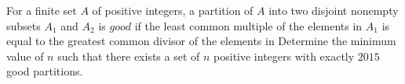 For a finite set $A$ of positive integers, a partition of $A$ into two disjoint nonempty subsets $A_1$ and $A_2$ is $\textit{good}$ if the least common multiple of the elements in $A_1$ is equal to the greatest common divisor of the elements in  Determine the minimum value of $n$ such that there exists a set of $n$ positive integers with exactly $2015$ good partitions.